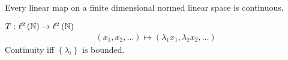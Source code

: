 \begin{proposition}
    Every linear map on a finite dimensional normed linear space is continuous.
    \label{prop:lin-map-on-fin-dim-cont}
\end{proposition}

\begin{example}
    $T: \ell ^{2} \left( \mathbb N \right) \to \ell ^{2} \left( \mathbb N \right)$
    \begin{align*}
	\left( x_{1},x_{2}, \ldots \right) \mapsto \left( \lambda_{1} x_{1}, \lambda _{2} x_{2}, \ldots \right)
    \end{align*}
    Continuity iff $\left\{ \lambda_{i} \right\}$ is bounded.

\end{example}
